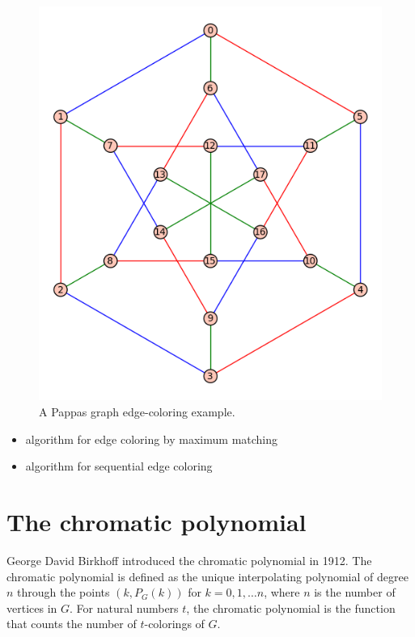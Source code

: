 \begin{example}
\begin{figure}[!htbp]
\centering
{}
\includegraphics[scale=0.7]{image/graph-coloring/pappas-graph-edge-coloring-example}
\caption{A Pappas graph edge-coloring example.}
\label{fig:graph-coloring:pappas-graph-edge-coloring-example}
\end{figure}

\end{example}



\begin{itemize}
\item algorithm for edge coloring by maximum matching
\item algorithm for sequential edge coloring
\end{itemize}



\section{The chromatic polynomial}

George David Birkhoff introduced the chromatic polynomial in 1912.
The chromatic polynomial is defined as the unique interpolating
polynomial of degree $n$ through the points $(k,P_G(k))$ for 
$k=0,1,\dots n$, where $n$ is the number of vertices in $G$. 
For natural numbers $t$, the chromatic polynomial is the function 
that counts the
number of $t$-colorings of $G$.

